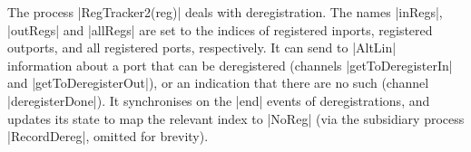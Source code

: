 





The process |RegTracker2(reg)| deals with deregistration.  The names |inRegs|,
|outRegs| and |allRegs| are set to the indices of registered inports,
registered outports, and all registered ports, respectively.  It can send to
|AltLin| information about a port that can be deregistered (channels
|getToDeregisterIn| and |getToDeregisterOut|), or an indication that there are
no such (channel |deregisterDone|).  It synchronises on the |end| events of
deregistrations, and updates its state to map the relevant index to |NoReg|
(via the subsidiary process |RecordDereg|, omitted for brevity).


